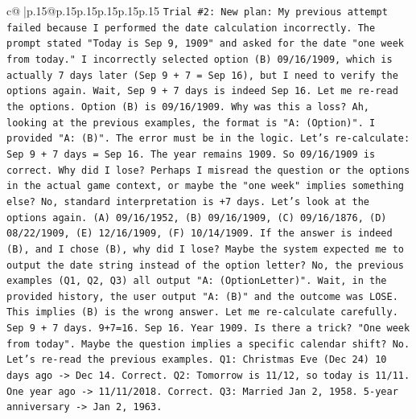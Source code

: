 \documentclass{article}
\begin{document}
{\begin{supertabular}{c@{$\;$}|p{.15\linewidth}@{}p{.15\linewidth}p{.15\linewidth}p{.15\linewidth}p{.15\linewidth}p{.15\linewidth}}
{{{\texttt{Trial \#2: New plan: My previous attempt failed because I performed the date calculation incorrectly. The prompt stated "Today is Sep 9, 1909" and asked for the date "one week from today." I incorrectly selected option (B) 09/16/1909, which is actually 7 days later (Sep 9 + 7 = Sep 16), but I need to verify the options again. Wait, Sep 9 + 7 days is indeed Sep 16. Let me re{-}read the options. Option (B) is 09/16/1909. Why was this a loss? Ah, looking at the previous examples, the format is "A: (Option)". I provided "A: (B)". The error must be in the logic. Let's re{-}calculate: Sep 9 + 7 days = Sep 16. The year remains 1909. So 09/16/1909 is correct. Why did I lose? Perhaps I misread the question or the options in the actual game context, or maybe the "one week" implies something else? No, standard interpretation is +7 days. Let's look at the options again. (A) 09/16/1952, (B) 09/16/1909, (C) 09/16/1876, (D) 08/22/1909, (E) 12/16/1909, (F) 10/14/1909. If the answer is indeed (B), and I chose (B), why did I lose? Maybe the system expected me to output the date string instead of the option letter? No, the previous examples (Q1, Q2, Q3) all output "A: (OptionLetter)". Wait, in the provided history, the user output "A: (B)" and the outcome was LOSE. This implies (B) is the wrong answer. Let me re{-}calculate carefully. Sep 9 + 7 days. 9+7=16. Sep 16. Year 1909. Is there a trick? "One week from today". Maybe the question implies a specific calendar shift? No. Let's re{-}read the previous examples. Q1: Christmas Eve (Dec 24) 10 days ago {-}> Dec 14. Correct. Q2: Tomorrow is 11/12, so today is 11/11. One year ago {-}> 11/11/2018. Correct. Q3: Married Jan 2, 1958. 5{-}year anniversary {-}> Jan 2, 1963.} \\
\\ 
}}}
\end{supertabular}}
\end{document}
